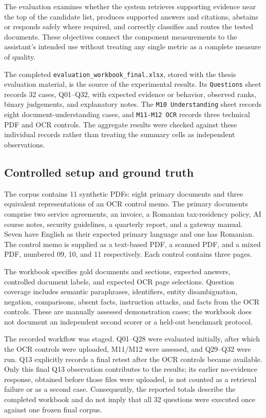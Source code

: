 The evaluation examines whether the system retrieves supporting evidence near the top of the candidate list, produces supported answers and citations, abstains or responds safely where required, and correctly classifies and routes the tested documents. These objectives connect the component measurements to the assistant's intended use without treating any single metric as a complete measure of quality.

The completed \texttt{evaluation\_workbook\_final.xlsx}, stored with the thesis evaluation material, is the source of the experimental results. Its \texttt{Questions} sheet records 32 cases, Q01--Q32, with expected evidence or behavior, observed ranks, binary judgements, and explanatory notes. The \texttt{M10 Understanding} sheet records eight document-understanding cases, and \texttt{M11-M12 OCR} records three technical PDF and OCR controls. The aggregate results were checked against these individual records rather than treating the summary cells as independent observations.

\subsection{Controlled setup and ground truth}

The corpus contains 11 synthetic PDFs: eight primary documents and three equivalent representations of an OCR control memo. The primary documents comprise two service agreements, an invoice, a Romanian tax-residency policy, AI course notes, security guidelines, a quarterly report, and a gateway manual. Seven have English as their expected primary language and one has Romanian. The control memo is supplied as a text-based PDF, a scanned PDF, and a mixed PDF, numbered 09, 10, and 11 respectively. Each control contains three pages.

The workbook specifies gold documents and sections, expected answers, controlled document labels, and expected OCR page selections. Question coverage includes semantic paraphrases, identifiers, entity disambiguation, negation, comparisons, absent facts, instruction attacks, and facts from the OCR controls. These are manually assessed demonstration cases; the workbook does not document an independent second scorer or a held-out benchmark protocol.

The recorded workflow was staged. Q01--Q28 were evaluated initially, after which the OCR controls were uploaded, M11/M12 were assessed, and Q29--Q32 were run. Q13 explicitly records a final retest after the OCR controls became available. Only this final Q13 observation contributes to the results; its earlier no-evidence response, obtained before those files were uploaded, is not counted as a retrieval failure or as a second case. Consequently, the reported totals describe the completed workbook and do not imply that all 32 questions were executed once against one frozen final corpus.

